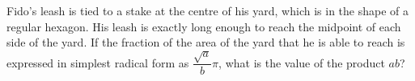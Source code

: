 Fido's leash is tied to a stake at the centre of his yard, which is in the shape of a regular hexagon. His leash is exactly long enough to reach the midpoint of each side of the yard. If the fraction of the area of the yard that he is able to reach is expressed in simplest radical form as $\dfrac{\sqrt a}{b}\pi$, what is the value of the product $ab$?
